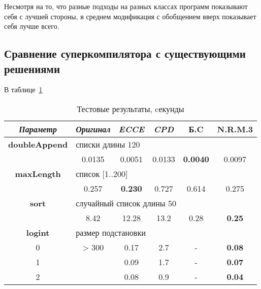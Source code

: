 Несмотря на то, что разные подходы на разных классах программ показывают
себя с лучшей стороны, в среднем модификация с обобщением вверх показывает себя
лучше всего.


\subsection{Сравнение суперкомпилятора с существующими решениями}

В таблице~\ref{fig:totalResult}

\begin{table}[h!]
\center
\begin{tabular}{|c|c|c|c|c|c|}
\hline
{\it Параметр} & {\it Оригинал} & {\it ECCE }  & {\it CPD} & {\bf Б.C} & {\bf N.R.M.3} \\ \hline
{\bf doubleAppend} & \multicolumn{5}{|l|}{списки длины 120 } \\ \hline
                   & 0.0135 & 0.0051 & 0.0133 & {\bf 0.0040} & 0.0097 \\ \hline


{\bf maxLength} & \multicolumn{5}{|l|}{список [1..200]} \\ \hline

                & 0.257 & {\bf 0.230} & 0.727 & 0.614 & 0.275 \\ \hline


{\bf sort} & \multicolumn{5}{|l|}{случайный список длины 50 } \\ \hline
         & 8.42     & 12.28 & 13.2 & 0.28  & {\bf 0.25} \\ \hline


{\bf logint} & \multicolumn{5}{|l|}{размер подстановки} \\ \hline
0 & > 300    & 0.17  & 2.7  & -  &  {\bf 0.08} \\
1 &          & 0.09  & 1.7  & -  &  {\bf 0.07} \\
2 &          & 0.08   & 0.9  & -  & {\bf 0.04} \\
\hline

\end{tabular}
\caption{Тестовые результаты, cекунды}
\label{fig:totalResult}
\end{table}


